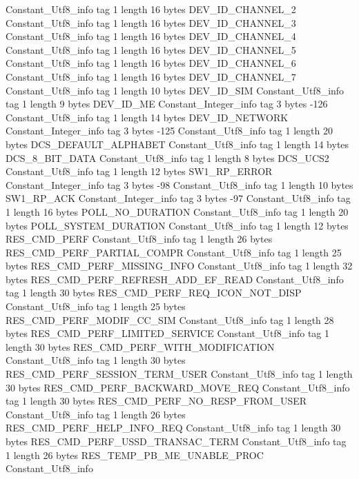 {{{		}
		Constant_Utf8_info {
			tag	1
			length	16
			bytes	DEV_ID_CHANNEL_2
		}
		Constant_Utf8_info {
			tag	1
			length	16
			bytes	DEV_ID_CHANNEL_3
		}
		Constant_Utf8_info {
			tag	1
			length	16
			bytes	DEV_ID_CHANNEL_4
		}
		Constant_Utf8_info {
			tag	1
			length	16
			bytes	DEV_ID_CHANNEL_5
		}
		Constant_Utf8_info {
			tag	1
			length	16
			bytes	DEV_ID_CHANNEL_6
		}
		Constant_Utf8_info {
			tag	1
			length	16
			bytes	DEV_ID_CHANNEL_7
		}
		Constant_Utf8_info {
			tag	1
			length	10
			bytes	DEV_ID_SIM
		}
		Constant_Utf8_info {
			tag	1
			length	9
			bytes	DEV_ID_ME
		}
		Constant_Integer_info {
			tag	3
			bytes	-126
		}
		Constant_Utf8_info {
			tag	1
			length	14
			bytes	DEV_ID_NETWORK
		}
		Constant_Integer_info {
			tag	3
			bytes	-125
		}
		Constant_Utf8_info {
			tag	1
			length	20
			bytes	DCS_DEFAULT_ALPHABET
		}
		Constant_Utf8_info {
			tag	1
			length	14
			bytes	DCS_8_BIT_DATA
		}
		Constant_Utf8_info {
			tag	1
			length	8
			bytes	DCS_UCS2
		}
		Constant_Utf8_info {
			tag	1
			length	12
			bytes	SW1_RP_ERROR
		}
		Constant_Integer_info {
			tag	3
			bytes	-98
		}
		Constant_Utf8_info {
			tag	1
			length	10
			bytes	SW1_RP_ACK
		}
		Constant_Integer_info {
			tag	3
			bytes	-97
		}
		Constant_Utf8_info {
			tag	1
			length	16
			bytes	POLL_NO_DURATION
		}
		Constant_Utf8_info {
			tag	1
			length	20
			bytes	POLL_SYSTEM_DURATION
		}
		Constant_Utf8_info {
			tag	1
			length	12
			bytes	RES_CMD_PERF
		}
		Constant_Utf8_info {
			tag	1
			length	26
			bytes	RES_CMD_PERF_PARTIAL_COMPR
		}
		Constant_Utf8_info {
			tag	1
			length	25
			bytes	RES_CMD_PERF_MISSING_INFO
		}
		Constant_Utf8_info {
			tag	1
			length	32
			bytes	RES_CMD_PERF_REFRESH_ADD_EF_READ
		}
		Constant_Utf8_info {
			tag	1
			length	30
			bytes	RES_CMD_PERF_REQ_ICON_NOT_DISP
		}
		Constant_Utf8_info {
			tag	1
			length	25
			bytes	RES_CMD_PERF_MODIF_CC_SIM
		}
		Constant_Utf8_info {
			tag	1
			length	28
			bytes	RES_CMD_PERF_LIMITED_SERVICE
		}
		Constant_Utf8_info {
			tag	1
			length	30
			bytes	RES_CMD_PERF_WITH_MODIFICATION
		}
		Constant_Utf8_info {
			tag	1
			length	30
			bytes	RES_CMD_PERF_SESSION_TERM_USER
		}
		Constant_Utf8_info {
			tag	1
			length	30
			bytes	RES_CMD_PERF_BACKWARD_MOVE_REQ
		}
		Constant_Utf8_info {
			tag	1
			length	30
			bytes	RES_CMD_PERF_NO_RESP_FROM_USER
		}
		Constant_Utf8_info {
			tag	1
			length	26
			bytes	RES_CMD_PERF_HELP_INFO_REQ
		}
		Constant_Utf8_info {
			tag	1
			length	30
			bytes	RES_CMD_PERF_USSD_TRANSAC_TERM
		}
		Constant_Utf8_info {
			tag	1
			length	26
			bytes	RES_TEMP_PB_ME_UNABLE_PROC
		}
		Constant_Utf8_info {
}}}
